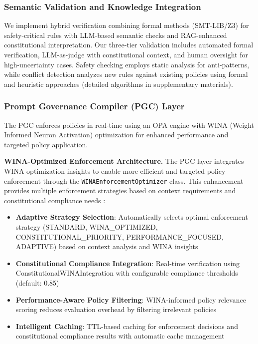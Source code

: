 \documentclass[manuscript,screen,review,anonymous,9pt]{acmart}
\begin{document}
\subsubsection{Semantic Validation and Knowledge Integration}
We implement hybrid verification combining formal methods (SMT-LIB/Z3) for safety-critical rules with LLM-based semantic checks and RAG-enhanced constitutional interpretation. Our three-tier validation includes automated formal verification, LLM-as-judge with constitutional context, and human oversight for high-uncertainty cases. Safety checking employs static analysis for anti-patterns, while conflict detection analyzes new rules against existing policies using formal and heuristic approaches (detailed algorithms in supplementary materials).

\subsubsection{Prompt Governance Compiler (PGC) Layer}
The PGC enforces policies in real-time using an OPA engine with WINA (Weight Informed Neuron Activation) optimization for enhanced performance and targeted policy application.

\textbf{WINA-Optimized Enforcement Architecture.} The PGC layer integrates WINA optimization insights \cite{WINA2024NeuronActivation} to enable more efficient and targeted policy enforcement through the \texttt{WINAEnforcementOptimizer} class. This enhancement provides multiple enforcement strategies based on context requirements and constitutional compliance needs \cite{PolicyEnforcementOptimization2024}:

\begin{itemize}
    \item \textbf{Adaptive Strategy Selection}: Automatically selects optimal enforcement strategy (STANDARD, WINA\_OPTIMIZED, CONSTITUTIONAL\_PRIORITY, PERFORMANCE\_FOCUSED, ADAPTIVE) based on context analysis and WINA insights
    \item \textbf{Constitutional Compliance Integration}: Real-time verification using ConstitutionalWINAIntegration with configurable compliance thresholds (default: 0.85) \cite{ConstitutionalCompliance2024}
    \item \textbf{Performance-Aware Policy Filtering}: WINA-informed policy relevance scoring reduces evaluation overhead by filtering irrelevant policies
    \item \textbf{Intelligent Caching}: TTL-based caching for enforcement decisions and constitutional compliance results with automatic cache management \cite{IntelligentCaching2024}
\end{itemize}
\end{document}
